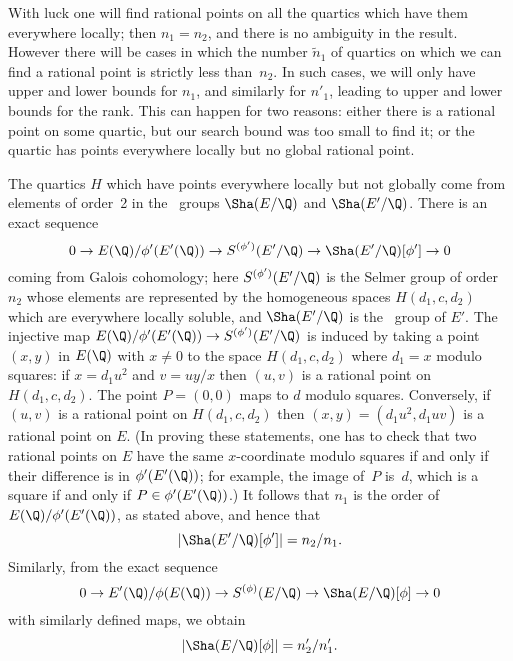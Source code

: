 With luck one will find rational points on all the quartics which have
them everywhere locally; then $n_1=n_2$, and there is no ambiguity in
the result.  However there will be cases in which the number
$\tilde{n}_1$ of quartics on which we can find a rational point is
strictly less than~$n_2$.  In such cases, we will only have upper and
lower bounds for $n_1$, and similarly for $n'_1$, leading to upper and
lower bounds for the rank.  This can happen for two reasons: either
there is a rational point on some quartic, but our search bound was
too small to find it; or the quartic has points everywhere locally but
no global rational point.

The quartics $H$ which have points everywhere locally but not globally
come from elements of order~2 in the \TS\ groups $\Sha(E/\Q)$ and
$\Sha(E'/\Q)$.  There is an exact sequence
$$
   0 \to E(\Q)/\phi'(E'(\Q)) \to S^{(\phi')}(E'/\Q) \to \Sha(E'/\Q)[\phi']\to 0
$$
coming from Galois cohomology; here $S^{(\phi')}(E'/\Q)$ is the Selmer
group of order $n_2$ whose elements are represented by the homogeneous
spaces $H(d_1,c,d_2)$ which are everywhere locally soluble, and
$\Sha(E'/\Q)$ is the \TS\ group of $E'$. The injective map
$E(\Q)/\phi'(E'(\Q)) \to S^{(\phi')}(E'/\Q)$ is induced by taking a
point $(x,y)$ in $E(\Q)$ with $x\not=0$ to the space $H(d_1,c,d_2)$
where $d_1=x$ modulo squares:  if $x=d_1u^2$ and $v=uy/x$ then
$(u,v)$ is a rational point on $H(d_1,c,d_2)$.  The point $P=(0,0)$
maps to $d$ modulo squares.  Conversely, if $(u,v)$ is a rational
point on $H(d_1,c,d_2)$ then $(x,y)=(d_1u^2,d_1uv)$ is a rational
point on $E$.  (In proving these statements, one has to check that two
rational points on $E$ have the same $x$-coordinate modulo squares if
and only if their difference is in $\phi'(E'(\Q))$; for example, the
image of~$P$ is~$d$, which is a square if and only if
$P\in\phi'(E'(\Q))$.)  It follows that $n_1$ is the order of
$E(\Q)/\phi'(E'(\Q))$, as stated above, and hence that
$$
   \left|\Sha(E'/\Q)[\phi']\right| = n_2/n_1.
$$
Similarly, from the exact sequence
$$
   0 \to E'(\Q)/\phi(E(\Q)) \to S^{(\phi)}(E/\Q) \to \Sha(E/\Q)[\phi]\to 0
$$
with similarly defined maps, we obtain
$$
   \left|\Sha(E/\Q)[\phi]\right| = n'_2/n'_1.
$$

